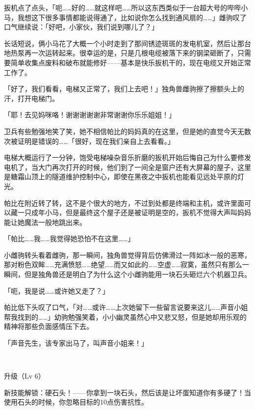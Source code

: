 扳机点了点头，「呃……好的……就这样吧……所以这东西类似于一台超大号的哔哔小马，我想这下很多事情都能说得通了，比如说你怎么找到通风扇的……」雌驹叹了口气继续说：「好吧，小家伙，我们说到哪儿了？」

\horizonline


长话短说，俩小马花了大概一个小时走到了那间锈迹斑斑的发电机室，然后让那台地热泵再一次运转起来。很幸运的是，只是几根电缆被落下来的钢梁砸断了，只需要简单收集点废料和破布就能修好——基本是快乐扳机干的，现在电缆又开始正常工作了。

「好了，我们看看，电梯又正常了，我们上去吧！」独角兽雌驹擦了擦额头上的汗，打开电梯门。

「耶！去见妈咪咯！谢谢谢谢谢非常谢谢你乐乐姐姐！」

卫兵有些勉强地笑了笑，她不相信帕比的妈妈真的在这里，但是她的直觉今天无数次被证明是错误的……「很好，现在我们亲自上去看看。」


电梯大概运行了一分钟，饱受电梯噪杂音乐折磨的扳机开始后悔自己为什么要修发电机了，当大门再次打开的时候，他们到了一间全是窗户还有大屏幕的屋子，这里是糖霜山顶上的隧道维护控制中心，即使在黑夜之中扳机也能看见远处平原的灯光。

帕比在附近转了转，这不是个很大的地方，不过到处都是终端和主机，或许里面可以藏一只成年小马，但是最终这个屋子还是被证明是空的，扳机不觉得大声叫妈妈能让她魔法一般地跳出来。

「帕比……我……我觉得她恐怕不在这里……」

小雌驹转头看着雌驹，那一瞬间，独角兽觉得背后仿佛滑过一阵如冰一般的恶寒，那对粉色双眸……充满愤怒……绝望……而又如此的……空虚……寂寞，虽然只有那么一瞬间，但是独角兽还是明白了为什么这个小雌驹能用一块石头砸烂六个机器卫兵。

「呃，我是说……或许她又走了？」

帕比低下头叹了口气，「对……或许……上次她留下一些留言说要来这儿……声音小姐帮我找到的……」幼驹勉强笑着，小小幽灵虽然心中又悲又怒，但是她却用乐观的精神将那些负面感情压下去。

「声音先生，该专家出马了，叫声音小姐来！」

~\vfill

\begin{note}
    升级（Lv 6）

    新技能解锁：硬石头！——你拿到一块石头，然后该是让坏蛋知道你有多硬了！当使用石头的时候，你忽略目标的10点伤害抗性。
\end{note}




